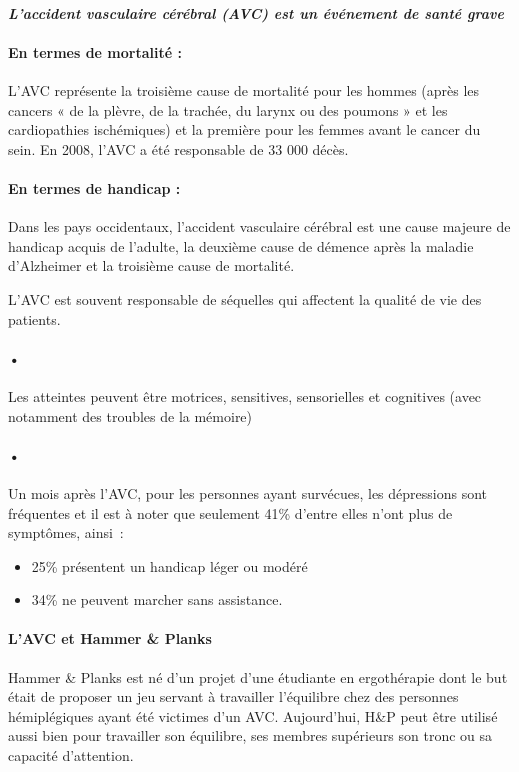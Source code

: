 \paragraph{\emph{L’accident vasculaire cérébral (AVC) est un événement de santé grave}\\}

	\paragraph{En termes de mortalité :}
    L’AVC représente la troisième cause de mortalité pour les hommes (après les cancers « de la plèvre, de la trachée, du larynx ou des poumons » et les cardiopathies ischémiques) et la première pour les femmes avant le cancer du sein.\newline
    En 2008, l’AVC a été responsable de 33 000 décès.

	\paragraph{En termes de handicap :}
Dans les pays occidentaux, l’accident vasculaire cérébral est une cause majeure de handicap acquis de l’adulte, la deuxième cause de démence après la maladie d’Alzheimer et la troisième cause de mortalité.	\newline

    L’AVC est souvent responsable de séquelles qui affectent la qualité de vie des patients. 

 \paragraph{•}
Les atteintes peuvent être motrices, sensitives, sensorielles et cognitives (avec notamment des troubles de la mémoire) 

\paragraph{•}Un mois après l’AVC, pour les personnes ayant survécues, les dépressions sont fréquentes et il est à noter que seulement 41\% d’entre elles n’ont plus de symptômes, ainsi~:
\begin{itemize}
	\item 25\% présentent un handicap léger ou modéré
	\item 34\% ne peuvent marcher sans assistance.
\end{itemize}
 
		\paragraph{L'AVC et Hammer \& Planks\\}
Hammer \& Planks est né d'un projet d'une étudiante en ergothérapie dont le but était de proposer un jeu servant à travailler l'équilibre chez des personnes hémiplégiques ayant été victimes d'un AVC. Aujourd'hui, H\&P peut être utilisé aussi bien pour travailler son équilibre, ses membres supérieurs son tronc ou sa capacité d'attention.   	
